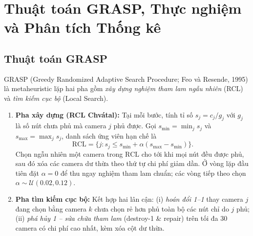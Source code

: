 
\section{Thuật toán GRASP, Thực nghiệm và Phân tích Thống kê}

\subsection{Thuật toán GRASP}
GRASP (Greedy Randomized Adaptive Search Procedure; Feo và Resende, 1995) là metaheuristic lặp hai pha gồm \emph{xây dựng nghiệm tham lam ngẫu nhiên} (RCL) và \emph{tìm kiếm cục bộ} (Local Search).
\begin{enumerate}
 \item \textbf{Pha xây dựng (RCL Chvátal):} Tại mỗi bước, tính tỉ số $s_j = c_j / g_j$ với $g_j$ là số nút chưa phủ mà camera $j$ phủ được. Gọi $s_{\min} = \min_j s_j$ và $s_{\max} = \max_j s_j$, danh sách ứng viên hạn chế là
 \[
  \mathrm{RCL} = \{ j : s_j \le s_{\min} + \alpha (s_{\max} - s_{\min}) \}.
 \]
 Chọn ngẫu nhiên một camera trong $\mathrm{RCL}$ cho tới khi mọi nút đều được phủ, sau đó xóa các camera dư thừa theo thứ tự chi phí giảm dần. Ở vòng lặp đầu tiên đặt $\alpha = 0$ để thu ngay nghiệm tham lam chuẩn; các vòng tiếp theo chọn $\alpha \sim \mathcal{U}(0.02, 0.12)$.
 \item \textbf{Pha tìm kiếm cục bộ:} Kết hợp hai lân cận: (i) \emph{hoán đổi 1--1} thay camera $j$ đang chọn bằng camera $k$ chưa chọn rẻ hơn phủ toàn bộ các nút chỉ do $j$ phủ; (ii) \emph{phá hủy 1 -- sửa chữa tham lam} (destroy-1 \& repair) trên tối đa 30 camera có chi phí cao nhất, kèm xóa cột dư thừa.
\end{enumerate}

